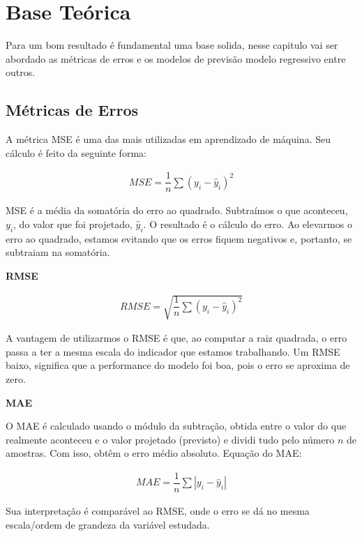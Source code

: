\section{Base Te\'orica}\label{sec:base}

Para um bom resultado é fundamental uma base solida, nesse capitulo vai ser abordado as métricas de erros e os modelos de previsão modelo regressivo entre outros.

\subsection{M\'etricas de Erros}\label{subsec:metrica}

A métrica MSE é uma das mais utilizadas em aprendizado de máquina. Seu cálculo é feito da seguinte forma:

\begin{eqnarray}
	M S E=\dfrac{1}{n} \sum\left(y_i-\hat{y}_i\right)^2\label{eq:mse}
\end{eqnarray}

MSE é a média da somatória do erro ao quadrado. Subtraímos o que aconteceu, $y_i$, do valor que foi projetado, $\hat{y}_i$. O resultado é o cálculo do erro. Ao elevarmos o erro ao quadrado, estamos evitando que os erros fiquem negativos e, portanto, se subtraiam na somatória.

\textbf{RMSE}

\begin{eqnarray}
	R M S E=\sqrt{\dfrac{1}{n} \sum\left(y_i-\hat{y}_i\right)^2}\label{eq:rmse}
\end{eqnarray}

A vantagem de utilizarmos o RMSE é que, ao computar a raiz quadrada, o erro passa a ter a mesma escala do indicador que estamos trabalhando. Um RMSE baixo, significa que a performance do modelo foi boa, pois o erro se aproxima de zero.

\textbf{MAE}

O MAE é calculado usando o módulo da subtração, obtida entre o valor do que realmente aconteceu e o valor projetado (previsto) e dividi tudo pelo número $n$ de amostras. Com isso, obtêm o erro médio absoluto. Equação do MAE:

\begin{eqnarray}
	M A E=\dfrac{1}{n} \sum\left|y_i-\hat{y}_i\right|\label{eq:mae}
\end{eqnarray}

Sua interpretação é comparável ao RMSE, onde o erro se dá no mesma escala/ordem de grandeza da variável estudada.

